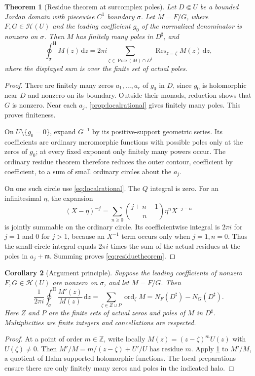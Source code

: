 \documentclass[11pt,letterpaper]{article}
\numberwithin{equation}{section}
\newtheorem{theorem}{Theorem}[section]
\newtheorem{corollary}[theorem]{Corollary}
\theoremstyle{definition}
\theoremstyle{remark}
\newcommand{\Z}{\mathbb{Z}}
\newcommand{\mm}{\mathfrak{m}}
\newcommand{\HH}{\mathcal{H}}
\newcommand{\dd}{\,\mathrm{d}}
\newcommand{\Res}{\operatorname{Res}}
\newcommand{\ord}{\operatorname{ord}}
\newcommand{\cooint}{\mathop{\oint}\nolimits^{\mathrm H}}
\begin{document}
\begin{theorem}[Residue theorem at surcomplex poles]\label{thm:residues}
Let $D\Subset U$ be a bounded Jordan domain with piecewise $C^1$ boundary
$\sigma$. Let $M=F/G$, where $F,G\in\HH(U)$ and the leading coefficient
$g_0$ of the normalized denominator is nonzero on $\sigma$. Then $M$ has
finitely many poles in $D^\sharp$, and
\begin{equation}\label{eq:residuetheorem}
 \cooint_\sigma M(z)\dd z
 =2\pi i\sum_{\zeta\in\operatorname{Pole}(M)\cap D^\sharp}
       \Res_{z=\zeta}M(z)\dd z,
\end{equation}
where the displayed sum is over the finite set of actual poles.
\end{theorem}
\begin{proof}
There are finitely many zeros $a_1,\ldots,a_r$ of $g_0$ in $D$, since
$g_0$ is holomorphic near $\overline D$ and nonzero on its boundary.
Outside their monads, reduction shows that $G$ is nonzero. Near each $a_j$,
\cref{prop:localrational} gives finitely many poles. This proves finiteness.

On $U\setminus\{g_0=0\}$, expand $G^{-1}$ by its positive-support geometric
series. Its coefficients are ordinary meromorphic functions with possible
poles only at the zeros of $g_0$; at every fixed exponent only finitely many
powers occur. The ordinary residue theorem therefore reduces the outer
contour, coefficient by coefficient, to a sum of small ordinary circles about
the $a_j$.

On one such circle use \eqref{eq:localrational}. The $Q$ integral is zero.
For an infinitesimal $\eta$, the expansion
\[
 (X-\eta)^{-j}=\sum_{n\ge0}\binom{j+n-1}{n}\eta^nX^{-j-n}
\]
is jointly summable on the ordinary circle. Its coefficientwise integral is
$2\pi i$ for $j=1$ and $0$ for $j>1$, because an $X^{-1}$ term occurs only
when $j=1,n=0$. Thus the small-circle integral equals $2\pi i$ times the
sum of the actual residues at the poles in $a_j+\mm$. Summing proves
\eqref{eq:residuetheorem}.
\end{proof}

\begin{corollary}[Argument principle]\label{cor:argument}
Suppose the leading coefficients of nonzero $F,G\in\HH(U)$ are nonzero
on $\sigma$, and let $M=F/G$. Then
\begin{equation}\label{eq:argument}
 \frac1{2\pi i}\cooint_\sigma\frac{M'(z)}{M(z)}\dd z
 =\sum_{\zeta\in Z\cup P}\ord_\zeta M
 =N_F(D^\sharp)-N_G(D^\sharp).
\end{equation}
Here $Z$ and $P$ are the finite sets of actual zeros and poles of $M$ in
$D^\sharp$. Multiplicities are finite integers and cancellations are
respected.
\end{corollary}
\begin{proof}
At a point of order $m\in\Z$, write locally
$M(z)=(z-\zeta)^mU(z)$ with $U(\zeta)\ne0$. Then
$M'/M=m/(z-\zeta)+U'/U$ has residue $m$. Apply
\cref{thm:residues} to $M'/M$, a quotient of Hahn-supported holomorphic
functions. The local preparations ensure there are only finitely many zeros
and poles in the indicated halo.
\end{proof}
\end{document}
